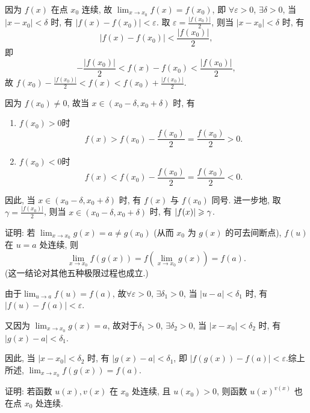 \begin{solution}
    因为 $f(x)$ 在点 $x_0$ 连续, 故 $\lim_{x \to x_0} f(x) = f(x_0)$, 即 $\forall \varepsilon > 0$, $\exists \delta > 0$, 当 $|x-x_0| < \delta$ 时, 有 $|f(x)-f(x_0)| < \varepsilon$. 
    取 $\varepsilon = \frac{|f(x_0)|}{2}$, 则当 $|x-x_0| < \delta$ 时, 有 $$|f(x)-f(x_0)| < \frac{|f(x_0)|}{2},$$即 $$-\frac{|f(x_0)|}{2} < f(x)-f(x_0) < \frac{|f(x_0)|}{2},$$ 故 $f(x_0)-\frac{|f(x_0)|}{2} < f(x) < f(x_0)+\frac{|f(x_0)|}{2}$. 
    
    因为 $f(x_0) \ne 0$, 故当 $x \in (x_0-\delta, x_0+\delta)$ 时, 有
    \begin{enumerate}
        \item $f(x_0) > 0$时$$ f(x) > f(x_0) - \frac{f(x_0)}{2} = \frac{f(x_0)}{2} > 0. $$
        \item $f(x_0) < 0$时$$ f(x) < f(x_0) - \frac{f(x_0)}{2} = \frac{f(x_0)}{2} < 0. $$
    \end{enumerate}
    
    因此, 当 $x \in (x_0-\delta, x_0+\delta)$ 时, 有 $f(x)$ 与 $f(x_0)$ 同号. 进一步地, 取 $\gamma = \frac{|f(x_0)|}{2}$, 则当 $x \in (x_0-\delta, x_0+\delta)$ 时, 有 $|f(x)| \geqslant \gamma$.
\end{solution}

\begin{exercise}[2.1.12]
    证明: 若 $\lim_{x \to x_0} g(x) = a \ne g(x_0)$ (从而 $x_0$ 为 $g(x)$ 的可去间断点), $f(u)$ 在 $u=a$ 处连续, 则
    $$ \lim_{x \to x_0} f(g(x)) = f\left(\lim_{x \to x_0} g(x)\right) = f(a). $$
    (这一结论对其他五种极限过程也成立.)
\end{exercise}

\begin{solution}
    由于$\lim_{u \to a} f(u) = f(a)$, 故$\forall \varepsilon > 0$, $\exists \delta_1 > 0$, 当 $|u-a| < \delta_1$ 时, 有 $|f(u)-f(a)| < \varepsilon$. 

    又因为 $\lim_{x \to x_0} g(x) = a$, 故对于$ \delta_1 > 0$, $\exists \delta_2 > 0$, 当 $|x-x_0| < \delta_2$ 时, 有 $|g(x)-a| < \delta_1$.

    因此, 当 $|x-x_0| < \delta_2$ 时, 有 $|g(x)-a| < \delta_1$, 即 $|f(g(x))-f(a)| < \varepsilon$.综上所述, $\lim_{x \to x_0} f(g(x)) = f(a)$.
\end{solution}

\begin{exercise}[2.1.13]
    证明: 若函数 $u(x), v(x)$ 在 $x_0$ 处连续, 且 $u(x_0) > 0$, 则函数 $u(x)^{v(x)}$ 也在点 $x_0$ 处连续.
\end{exercise}

